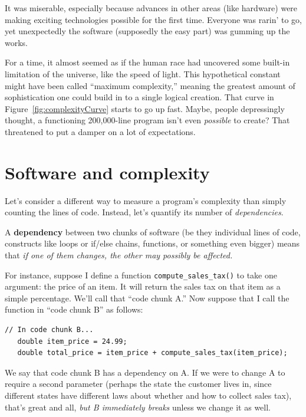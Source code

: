 It was miserable, especially because advances in other areas (like hardware)
were making exciting technologies possible for the first time. Everyone was
rarin' to go, yet unexpectedly the software (supposedly the easy part) was
gumming up the works.

For a time, it almost seemed as if the human race had uncovered some built-in
limitation of the universe, like the speed of light. This hypothetical
constant might have been called ``maximum complexity,'' meaning the greatest
amount of sophistication one could build in to a single logical creation. That
curve in Figure~\ref{fig:complexityCurve} starts to go up fast. Maybe, people
depressingly thought, a functioning 200,000-line program isn't even
\textit{possible} to create? That threatened to put a damper on a lot of
expectations.

\section{Software and complexity}

Let's consider a different way to measure a program's complexity than simply
counting the lines of code. Instead, let's quantify its number of
\textit{dependencies}.

A \textbf{dependency} between two chunks of software (be they individual lines
of code, constructs like loops or if/else chains, functions, or something even
bigger) means that \textit{if one of them changes, the other may possibly be
affected.}

For instance, suppose I define a function \texttt{compute\_sales\_tax()} to
take one argument: the price of an item. It will return the sales tax on that
item as a simple percentage. We'll call that ``code chunk A.'' Now suppose
that I call the function in ``code chunk B'' as follows:

\begin{Verbatim}[fontsize=\small,samepage=true,frame=single]
   // In code chunk B...
   double item_price = 24.99;
   double total_price = item_price + compute_sales_tax(item_price);
\end{Verbatim}

We say that code chunk B has a dependency on A. If we were to change A to
require a second parameter (perhaps the state the customer lives in, since
different states have different laws about whether and how to collect sales
tax), that's great and all, \textit{but B immediately breaks} unless we change
it as well.

